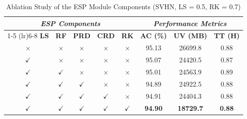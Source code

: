 \begin{table}[t]
\centering
\caption{Ablation Study of the ESP Module Components (SVHN, LS = 0.5, RK = 0.7)}
\label{tab:esp_ablation_svhn}
\scriptsize
\setlength{\tabcolsep}{2.5pt}
\begin{tabular}{ccccc ccc}
\toprule
\multicolumn{5}{c}{\textbf{\textit{ESP Components}}} & \multicolumn{3}{c}{\textbf{\textit{Performance Metrics}}} \\
\cmidrule(lr){1-5} \cmidrule(lr){6-8}
\textbf{LS} & \textbf{RF} & \textbf{PRD} & \textbf{CRD} & \textbf{RK} & \textbf{AC (\%)} & \textbf{UV (MB)} & \textbf{TT (H)} \\
\midrule
$\times$ & $\times$ & $\times$ & $\times$ & $\times$ & 95.13 & 26699.8 & 0.88 \\
$\checkmark$ & $\times$ & $\times$ & $\times$ & $\times$ & 95.07 & 24420.5 & 0.87 \\
$\checkmark$ & $\checkmark$ & $\times$ & $\times$ & $\times$ & 95.01 & 24563.9 & 0.89 \\
$\checkmark$ & $\checkmark$ & $\checkmark$ & $\times$ & $\times$ & 94.89 & 24922.5 & 0.88 \\
$\checkmark$ & $\checkmark$ & $\checkmark$ & $\checkmark$ & $\times$ & 94.91 & 24404.3 & 0.88 \\
\rowcolor{gray!15}
$\checkmark$ & $\checkmark$ & $\checkmark$ & $\checkmark$ & $\checkmark$ & \textbf{94.90} & \textbf{18729.7} & \textbf{0.88} \\
\bottomrule
\end{tabular}
\end{table}
